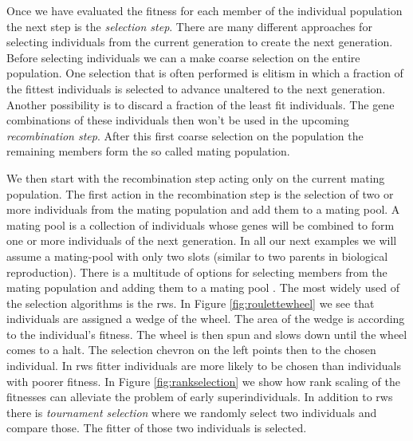 Once we have evaluated the fitness for each member of the \gls{individual} population the next step is the \textit{selection step}. There are many different approaches for selecting \glspl{individual} from the current generation to create the next generation. Before selecting \glspl{individual} we can a make coarse selection on the entire population. One selection that is often performed is \gls{elitism} in which a fraction of the fittest individuals is selected to advance unaltered to the next generation. Another possibility is to discard a fraction of the least fit \glspl{individual}. The \gls{gene} combinations of these  \glspl{individual} then won't be used in the upcoming \textit{recombination step}. After this first coarse selection on the population the remaining members form the so called mating population.

We then start with the recombination step acting only on the current mating population. The first action in the recombination step is the selection of two or more individuals from the mating population and add them to a mating pool. A mating pool is a collection of \glspl{individual} whose \glspl{gene} will be combined to form one or more \glspl{individual} of the next generation. In all our next examples we will assume a mating-pool with only two slots (similar to two parents in biological reproduction). There is a multitude of options for selecting members from the mating population and adding them to a mating pool \citep[for an overview see]{Goldberg91acomparative}. The most widely used of the selection algorithms is the \gls{rws}. In Figure \ref{fig:roulettewheel} we see that \glspl{individual} are assigned a wedge of the wheel. The area of the wedge is according to the \gls{individual}'s fitness. The wheel is then spun and slows down until the wheel comes to a halt. The selection chevron on the left points then to the chosen \gls{individual}. In \gls{rws} fitter \glspl{individual} are more likely to be chosen than \glspl{individual} with poorer \gls{fitness}. In Figure \ref{fig:rankselection} we show how rank scaling of the fitnesses can alleviate the problem of early \glspl{superindividual}. In addition to \gls{rws} there is \textit{tournament selection} where we randomly select two individuals and compare those. The fitter of those two individuals is selected. 

